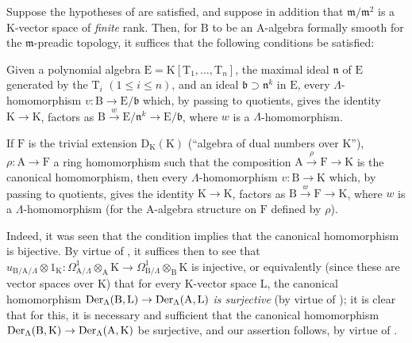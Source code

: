 \begin{remark}[22.1.3]
\label{0.22.1.3}
Suppose the hypotheses of  are satisfied, and suppose in addition that $\mathfrak{m}/\mathfrak{m}^2$ is a $\mathrm{K}$-vector space of \emph{finite} rank.
Then, for $\mathrm{B}$ to be an $\mathrm{A}$-algebra formally smooth for the $\mathfrak{m}$-preadic topology, it suffices that the following conditions be satisfied:

\begin{env}[22.1.3.1]
\label{0.22.1.3.1}
Given a polynomial algebra $\mathrm{E}=\mathrm{K}[\mathrm{T}_1,\ldots,\mathrm{T}_n]$, the maximal ideal $\mathfrak{n}$ of $\mathrm{E}$ generated by the $\mathrm{T}_i$ $(1\leq i\leq n)$, and an ideal $\mathfrak{b}\supset\mathfrak{n}^k$ in $\mathrm{E}$, every $\Lambda$-homomorphism $v:\mathrm{B}\to\mathrm{E}/\mathfrak{b}$ which, by passing to quotients, gives the identity $\mathrm{K}\to\mathrm{K}$, factors as $\mathrm{B}\xrightarrow{w}\mathrm{E}/\mathfrak{n}^k\to\mathrm{E}/\mathfrak{b}$, where $w$ is a $\Lambda$-homomorphism.
\end{env}

\begin{env}[22.1.3.2]
\label{0.22.1.3.2}
If $\mathrm{F}$ is the trivial extension $\mathrm{D}_\mathrm{K}(\mathrm{K})$ (``algebra of dual numbers over $\mathrm{K}$''), $\rho:\mathrm{A}\to\mathrm{F}$ a ring homomorphism such that the composition $\mathrm{A}\xrightarrow{\rho}\mathrm{F}\to\mathrm{K}$ is the canonical homomorphism, then every $\Lambda$-homomorphism $v:\mathrm{B}\to\mathrm{K}$ which, by passing to quotients, gives the identity $\mathrm{K}\to\mathrm{K}$, factors as $\mathrm{B}\xrightarrow{w}\mathrm{F}\to\mathrm{K}$, where $w$ is a $\Lambda$-homomorphism (for the $\mathrm{A}$-algebra structure on $\mathrm{F}$ defined by $\rho$).
\end{env}

Indeed, it was seen  that the condition  implies that the canonical homomorphism  is bijective.
By virtue of , it suffices then to see that $u_{\mathrm{B}/\mathrm{A}/\Lambda}\otimes 1_\mathrm{K}:\Omega^1_{\mathrm{A}/\Lambda}\otimes_\mathrm{A}\mathrm{K}\to\Omega^1_{\mathrm{B}/\Lambda}\otimes_\mathrm{B}\mathrm{K}$ is injective, or equivalently (since these are vector spaces over $\mathrm{K}$) that for every $\mathrm{K}$-vector space $\mathrm{L}$, the canonical homomorphism $\operatorname{Der}_\Lambda(\mathrm{B},\mathrm{L})\to\operatorname{Der}_\Lambda(\mathrm{A},\mathrm{L})$ \emph{is surjective} (by virtue of ); it is clear that for this, it is necessary and sufficient that the canonical homomorphism $\operatorname{Der}_\Lambda(\mathrm{B},\mathrm{K})\to\operatorname{Der}_\Lambda(\mathrm{A},\mathrm{K})$ be surjective, and our assertion follows, by virtue of .


\end{remark}
